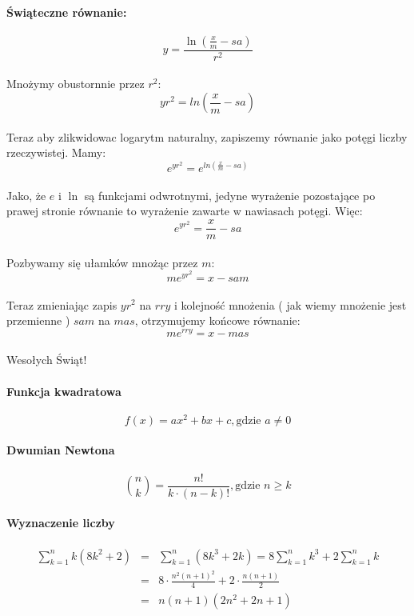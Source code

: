 \documentclass[oneside, fleqn]{book}
\begin{document}
\paragraph{Świąteczne równanie:} 
\[y=\frac{\ln(\frac{x}{m}-sa)}{r^2} \] \\
Mnożymy obustornnie przez $r^2$: \[ yr^2=ln(\frac{x}{m}-sa) \] \\
Teraz aby zlikwidowac logarytm naturalny, zapiszemy równanie jako potęgi liczby rzeczywistej. Mamy: \[ e^{yr^2} = e^{ln(\frac{x}{m}-sa)} \] \\
Jako, że $e$ i $\ln$ są funkcjami odwrotnymi, jedyne wyrażenie pozostające po prawej stronie równanie to wyrażenie zawarte w nawiasach potęgi. Więc: \[e^{yr^2}=\frac{x}{m}-sa  \] \\
Pozbywamy się ułamków mnożąc przez $m$: \[ me^{yr^2}=x-sam \] \\
Teraz zmieniając zapis $yr^2$ na $rry$ i kolejność mnożenia ( jak wiemy mnożenie jest przemienne ) $sam$ na $mas$, otrzymujemy końcowe równanie: \[ me^{rry}=x-mas \] \\
Wesołych Świąt!

\paragraph{Funkcja kwadratowa}
\begin{displaymath}f(x)=ax^2+bx+c, \textrm{gdzie } a \ne 0\end{displaymath}

\paragraph{Dwumian Newtona}
\begin{displaymath}\binom{n}{k}=\frac{n!}{k\cdot(n-k)!}, \textrm{gdzie } n \ge k\end{displaymath}
\paragraph{Wyznaczenie liczby}
\begin{eqnarray*}
\sum_{k=1}^{n}k(8k^2+2) & = & \sum_{k=1}^{n}(8k^3+2k) = 8\sum_{k=1}^{n}k^3 + 2\sum_{k=1}^{n}k \\
& = & 8\cdot \frac{n^2(n+1)^2}{4} + 2\cdot \frac{n(n+1)}{2} \\
& = & n(n+1)(2n^2+2n+1)
\end{eqnarray*}
\end{document}
